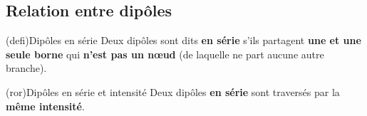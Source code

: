 \documentclass[../../main/main.tex]{subfiles}
\begin{document}
\begin{tcb*}[label=def:convrg, sidebyside, righthand width=.3\linewidth]
\begin{center}
{		}%
	\end{center}
\end{tcb*}

\subsection{Relation entre dipôles}
\begin{tcb*}[sidebyside, righthand ratio=.4](defi){Dipôles en série}
	Deux dipôles sont dits \textbf{en série} s'ils partagent \textbf{une et une
		seule borne} qui \textbf{n'est pas un nœud} (de laquelle ne part aucune
	autre branche).
	\tcblower
	\begin{center}
	\end{center}
\end{tcb*}
\begin{tcb*}[label=ror:serdiv, fontupper=\Large, cnt](ror){Dipôles en série et
			intensité}
	Deux dipôles \textbf{en série} sont traversés par la \textbf{même
		intensité}.
\end{tcb*}
\end{document}
